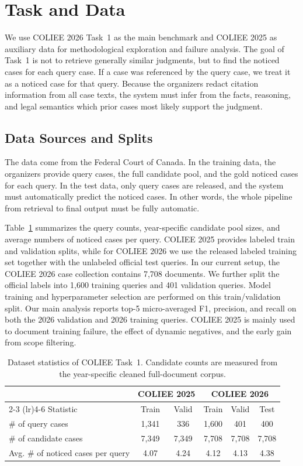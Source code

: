 \section{Task and Data}

We use COLIEE 2026 Task~1 as the main benchmark and COLIEE 2025 as auxiliary data for methodological exploration and failure analysis. The goal of Task~1 is not to retrieve generally similar judgments, but to find the noticed cases for each query case. If a case was referenced by the query case, we treat it as a noticed case for that query. Because the organizers redact citation information from all case texts, the system must infer from the facts, reasoning, and legal semantics which prior cases most likely support the judgment.

\subsection{Data Sources and Splits}

The data come from the Federal Court of Canada. In the training data, the organizers provide query cases, the full candidate pool, and the gold noticed cases for each query. In the test data, only query cases are released, and the system must automatically predict the noticed cases. In other words, the whole pipeline from retrieval to final output must be fully automatic.

Table~\ref{tab:dataset-stats} summarizes the query counts, year-specific candidate pool sizes, and average numbers of noticed cases per query. COLIEE 2025 provides labeled train and validation splits, while for COLIEE 2026 we use the released labeled training set together with the unlabeled official test queries. In our current setup, the COLIEE 2026 case collection contains 7,708 documents. We further split the official labels into 1,600 training queries and 401 validation queries. Model training and hyperparameter selection are performed on this train/validation split. Our main analysis reports top-5 micro-averaged F1, precision, and recall on both the 2026 validation and 2026 training queries. COLIEE 2025 is mainly used to document training failure, the effect of dynamic negatives, and the early gain from scope filtering.

\begin{table}[t]
\caption{Dataset statistics of COLIEE Task~1. Candidate counts are measured from the year-specific cleaned full-document corpus.}
\label{tab:dataset-stats}
\centering
\small
\setlength{\tabcolsep}{5pt}
\begin{tabular}{lccccc}
\toprule
 & \multicolumn{2}{c}{COLIEE 2025} & \multicolumn{3}{c}{COLIEE 2026} \\
\cmidrule(lr){2-3} \cmidrule(lr){4-6}
Statistic & Train & Valid & Train & Valid & Test \\
\midrule
\# of query cases & 1,341 & 336 & 1,600 & 401 & 400 \\
\# of candidate cases & 7,349 & 7,349 & 7,708 & 7,708 & 7,708 \\
Avg. \# of noticed cases per query & 4.07 & 4.24 & 4.12 & 4.13 & 4.38 \\
\bottomrule
\end{tabular}
\end{table}

